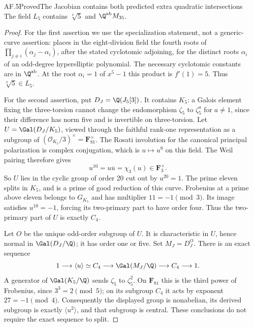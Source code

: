 \begin{statement}{AF.5}{Proved}{The Jacobian contains both predicted extra quadratic intersections}
The field $L_5$ contains $\sqrt[4]5$ and $\Q^{\mathrm{ab}}M_{35}$.
\end{statement}
\begin{proof}
For the first assertion we use the specialization statement,
not a generic-curve assertion: \citet[Corollary 1.2(a)]{Yelton2019}
places in the eight-division field the fourth roots of
$\prod_{j\ne i}(\alpha_j-\alpha_i)$, after the stated cyclotomic
adjoining, for the distinct roots $\alpha_i$ of an odd-degree
hyperelliptic polynomial. The necessary cyclotomic constants
are in $\Q^{\mathrm{ab}}$. At the root $\alpha_i=1$ of
$x^5-1$ this product is $f'(1)=5$. Thus
$\sqrt[4]5\in L_5$.

For the second assertion, put $D_J=\Q(J_5[3])$.
It contains $K_5$: a Galois element fixing the three-torsion
cannot change the endomorphism $\zeta_5$ to $\zeta_5^a$ for
$a\ne1$, since their difference has norm five and is invertible
on three-torsion. Let $U=\Gal(D_J/K_5)$, viewed through the
faithful rank-one representation as a subgroup of
$(\mathcal O_{K_5}/3)^\times=\mathbf F_{81}^\times$.
The Rosati involution for the canonical principal polarization
is complex conjugation, which is $u\mapsto u^9$ on this field.
The Weil pairing therefore gives
\[
                 u^{10}=u\overline u=\chi_3(u)\in\mathbf F_3^\times.
\]
So $U$ lies in the cyclic group of order 20 cut out by $u^{20}=1$.
The prime eleven splits in $K_5$, and is a prime of good reduction
of this curve. Frobenius at a prime above eleven belongs to
$G_{K_5}$ and has multiplier $11=-1\pmod3$. Its image satisfies
$u^{10}=-1$, forcing its two-primary part to have order four.
Thus the two-primary part of $U$ is exactly $C_4$.

Let $O$ be the unique odd-order subgroup of $U$. It is
characteristic in $U$, hence normal in $\Gal(D_J/\Q)$; it has
order one or five. Set $M_J=D_J^O$. There is an exact sequence
\[
  1\longrightarrow\langle u\rangle\simeq C_4
   \longrightarrow\Gal(M_J/\Q)\longrightarrow C_4
   \longrightarrow1.
\]
A generator of $\Gal(K_5/\Q)$ sends $\zeta_5$ to $\zeta_5^2$.
On $\mathbf F_{81}$ this is the third power of Frobenius, since
$3^3=2\pmod5$; on its subgroup $C_4$ it acts by exponent
$27=-1\pmod4$. Consequently the displayed group is nonabelian,
its derived subgroup is exactly $\langle u^2\rangle$, and that
subgroup is central. These conclusions do not require the exact
sequence to split.


\end{proof}
